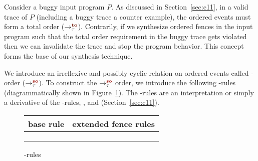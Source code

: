 Consider a buggy input program $P$.
%
As discussed in Section~\ref{sec:c11}, in a valid trace of $P$ 
(including a buggy trace \aka a counter example), 
the \sc ordered events must form a total order ($\setTO$).
%
Contrarily, if we synthesize \sc ordered fences in the input program 
such that the total order requirement in the buggy trace gets violated 
then we can invalidate the trace and stop the program behavior.
This concept forms the base of our synthesis technique.

We introduce an irreflexive and possibly cyclic relation
on \sc ordered events called \sc-order ($\setSO$).
%
To construct the $\setSO$ order, we introduce the following \lso-rules
(diagrammatically shown in Figure~\ref{fig:so rules}).
The \lso-rules are an interpretation or simply a derivative 
of the \lto-rules, ,  and  
(Section~\ref{sec:c11}).

\begin{figure}[t]
	\begin{tabular}{|c||c|c|c|}
		\multicolumn{1}{c}{base rule} & 
		\multicolumn{3}{c}{extended fence rules} \\\hline
		
		\resizebox{0.24\textwidth}{!}{} &
		\resizebox{0.24\textwidth}{!}{} &
		\resizebox{0.24\textwidth}{!}{} &
		\resizebox{0.24\textwidth}{!}{} \\
		\hline\hline
		
		\resizebox{0.24\textwidth}{!}{} &
		\resizebox{0.24\textwidth}{!}{} &
		\resizebox{0.24\textwidth}{!}{} &
		\resizebox{0.24\textwidth}{!}{} \\
		\hline
		
		\multicolumn{1}{c||}{} & 
		\resizebox{0.24\textwidth}{!}{} &
		\resizebox{0.24\textwidth}{!}{} & 
		\multicolumn{1}{|c}{}\\
		\cline{2-3}
	\end{tabular}
	\caption{\lso-rules}
	\label{fig:so rules}
\end{figure}

